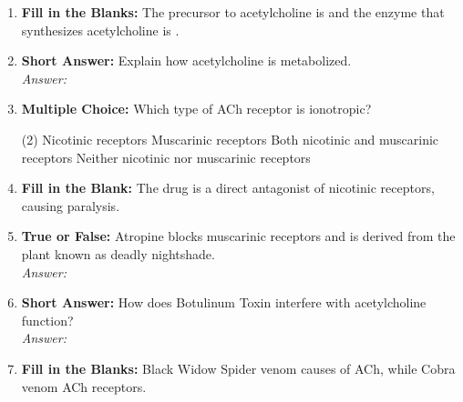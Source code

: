 \begin{enumerate}[label=\textbf{Q3.4.\arabic*}]
    \item \textbf{Fill in the Blanks:} The precursor to acetylcholine is \underline{\hspace{3cm}} and the enzyme that synthesizes acetylcholine is \underline{\hspace{3cm}}.

    \item \textbf{Short Answer:} Explain how acetylcholine is metabolized. \\
        \textit{Answer:} %

    \item \textbf{Multiple Choice:} Which type of ACh receptor is ionotropic?
        \begin{tasks}[label=\textcolor{\documentTheme}{(\Alph*)}, item-format=\color{\documentTheme}, label-width=1.5em, item-indent=1.7em](2)
            \task Nicotinic receptors
            \task Muscarinic receptors
            \task Both nicotinic and muscarinic receptors
            \task Neither nicotinic nor muscarinic receptors
        \end{tasks}

    \item \textbf{Fill in the Blank:} The drug \underline{\hspace{3cm}} is a direct antagonist of nicotinic receptors, causing paralysis.

    \item \textbf{True or False:} Atropine blocks muscarinic receptors and is derived from the plant known as deadly nightshade. \\
        \textit{Answer:} %

    \item \textbf{Short Answer:} How does Botulinum Toxin interfere with acetylcholine function? \\
        \textit{Answer:} %

    \item \textbf{Fill in the Blanks:} Black Widow Spider venom causes \underline{\hspace{3cm}} of ACh, while Cobra venom \underline{\hspace{3cm}} ACh receptors.


\end{enumerate}
